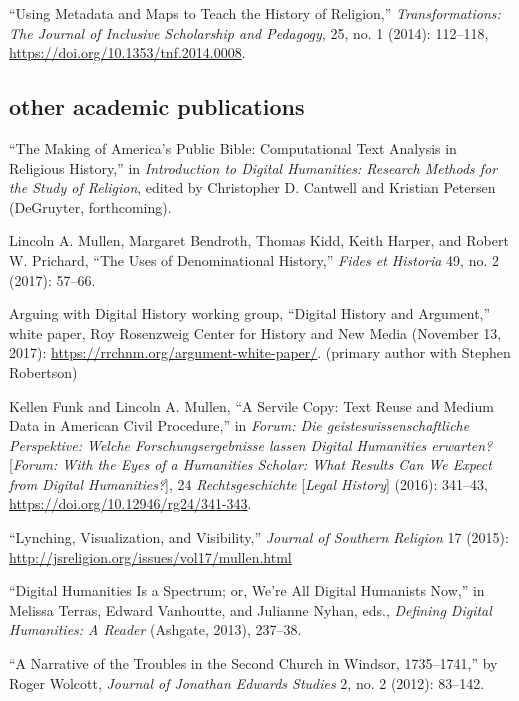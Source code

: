 \documentclass[11pt]{article}
\begin{document}
``Using Metadata and Maps to Teach the History of Religion,'' \emph{Transformations: The Journal of Inclusive Scholarship and Pedagogy}, 25, no. 1 (2014): 112--118, \url{https://doi.org/10.1353/tnf.2014.0008}.


\subsection{other academic publications}\label{other-academic}

``The Making of America's Public Bible: Computational Text Analysis in 
Religious History,'' in \emph{Introduction to Digital Humanities: Research 
Methods for the Study of Religion}, edited by Christopher D. Cantwell and 
Kristian Petersen (DeGruyter, forthcoming).

Lincoln A. Mullen, Margaret Bendroth, Thomas Kidd, Keith Harper, and Robert W. 
Prichard, ``The Uses of Denominational History,'' \emph{Fides et Historia} 49, 
no. 2 (2017): 57--66.

Arguing with Digital History working group, ``Digital History and Argument,'' 
white paper, Roy Rosenzweig Center for History and New Media (November 13, 
2017): \url{https://rrchnm.org/argument-white-paper/}. (primary author with 
     Stephen Robertson)

Kellen Funk and Lincoln A. Mullen, ``A Servile Copy: Text Reuse and Medium Data 
in American Civil Procedure,'' in \emph{Forum: Die geisteswissenschaftliche 
  Perspektive: Welche Forschungsergebnisse lassen Digital Humanities 
  erwarten?} [\emph{Forum: With the Eyes of a Humanities Scholar: What Results 
  Can We Expect from Digital Humanities?}], 24 \emph{Rechtsgeschichte} 
[\emph{Legal History}] (2016): 341--43, 
\url{https://doi.org/10.12946/rg24/341-343}.

``Lynching, Visualization, and Visibility,'' \emph{Journal of Southern 
  Religion} 17 (2015): \url{http://jsreligion.org/issues/vol17/mullen.html}

``Digital Humanities Is a Spectrum; or, We're All Digital Humanists
Now,'' in Melissa Terras, Edward Vanhoutte, and Julianne Nyhan, eds.,
\emph{Defining Digital Humanities: A Reader} (Ashgate, 2013), 237--38.

``A Narrative of the Troubles in the Second Church in Windsor,
1735--1741,'' by Roger Wolcott, \emph{Journal of Jonathan Edwards
  Studies} 2, no. 2 (2012): 83--142.
\end{document}
